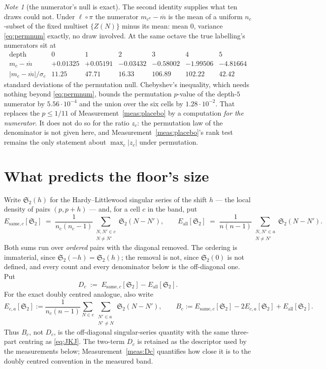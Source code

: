 \documentclass[11pt,a4paper]{article}
\theoremstyle{plain}
\theoremstyle{definition}
\theoremstyle{remark}
\newtheorem{note}[theorem]{Note}
\renewcommand{\SS}{\mathfrak{S}}
\begin{document}
\begin{note}[the numerator's null is exact]\label{note:numnull}
The second identity supplies what ten draws could not. Under
$\ell\circ\pi$ the numerator $m_{c^\pi}-\overline m$ is the mean of a
uniform $n_c$-subset of the fixed multiset $\{Z(N)\}$ minus its mean:
mean $0$, variance \eqref{eq:permnum} exactly, no draw involved. At
the same octave the true labelling's numerators sit at
\[
\begin{array}{r|cccccc}
 \text{depth} & 0 & 1 & 2 & 3 & 4 & 5\\\hline
 m_c-\overline m & +0.01325 & +0.05191 & -0.03432 & -0.58002
   & -1.99506 & -4.81664\\
 \bigl|m_c-\overline m\bigr|\big/\sigma_c
   & 11.25 & 47.71 & 16.33 & 106.89 & 102.22 & 42.42
\end{array}
\]
standard deviations of the permutation null. Chebyshev's inequality,
which needs nothing beyond \eqref{eq:permnum}, bounds the permutation
$p$-value of the depth-$5$ numerator by $5.56\cdot10^{-4}$ and the
union over the six cells by $1.28\cdot10^{-2}$. That replaces the
$p\le1/11$ of Measurement~\ref{meas:placebo} by a computation
\emph{for the numerator}. It does not do so for the ratio $z_c$: the
permutation law of the denominator is not given here, and
Measurement~\ref{meas:placebo}'s rank test remains the only statement
about $\max_c|z_c|$ under permutation.
\end{note}

\section{What predicts the floor's size}\label{sec:size}

Write $\SS_2(h)$ for the Hardy--Littlewood singular series of the
shift $h$ --- the local density of pairs $(p,p+h)$ --- and, for a cell
$c$ in the band, put
\[
  E_{\mathrm{same},c}[\SS_2]
  \;=\;\frac{1}{n_c(n_c-1)}\sum_{\substack{N,N'\in c\\ N\neq N'}}\SS_2(N-N'),
  \qquad
  E_{\mathrm{all}}[\SS_2]
  \;=\;\frac{1}{n(n-1)}\sum_{\substack{N,N'\in a\\ N\neq N'}}\SS_2(N-N').
\]
Both sums run over \emph{ordered} pairs with the diagonal removed. The
ordering is immaterial, since $\SS_2(-h)=\SS_2(h)$; the removal is not,
since $\SS_2(0)$ is not defined, and every count and every denominator
below is the off-diagonal one. Put
\begin{equation}\label{eq:Dc}
  D_c\;:=\;E_{\mathrm{same},c}[\SS_2]-E_{\mathrm{all}}[\SS_2].
\end{equation}
For the exact doubly centred analogue, also write
\[
  E_{c,a}[\SS_2]
  :=\frac{1}{n_c(n-1)}
    \sum_{N\in c}\sum_{\substack{N'\in a\\N'\ne N}}\SS_2(N-N'),
  \qquad
  B_c:=E_{\mathrm{same},c}[\SS_2]-2E_{c,a}[\SS_2]
       +E_{\mathrm{all}}[\SS_2].
\]
Thus $B_c$, not $D_c$, is the off-diagonal singular-series quantity
with the same three-part centring as \eqref{eq:JKJ}. The two-term
$D_c$ is retained as the descriptor used by the measurements below;
Measurement~\ref{meas:Dc} quantifies how close it is to the doubly
centred convention in the measured band.
\end{document}
